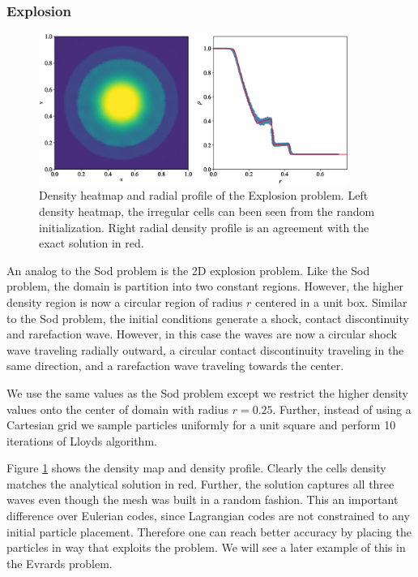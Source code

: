 \subsubsection{Explosion}
\begin{figure}
    \begin{center}
        \includegraphics[width=0.9\textwidth]{figures/explosion_2d.eps}
        \caption{Density heatmap and radial profile of the Explosion problem. Left density
        heatmap, the irregular cells can been seen from the random initialization. Right
        radial density profile is an agreement with the exact solution in red.}
        \label{fig.explosion_2d}
    \end{center}
\end{figure}
An analog to the Sod problem is the 2D explosion problem. Like the Sod problem, the domain
is partition into two constant regions. However, the higher density region is now a circular
region of radius $r$ centered in a unit box. Similar to the Sod problem, the initial 
conditions generate a shock, contact discontinuity and rarefaction wave. However, in this case
the waves are now a circular shock wave traveling radially outward, a circular contact
discontinuity traveling in the same direction, and a rarefaction wave traveling towards the
center.

We use the same values as the Sod problem except we restrict the higher density values onto
the center of domain with radius $r=0.25$. Further, instead of using a Cartesian grid we sample
particles uniformly for a unit square and perform 10 iterations of Lloyds algorithm. 

Figure \ref{fig.explosion_2d} shows the density map and density profile. Clearly the cells
density matches the analytical solution in red. Further, the solution captures all three waves
even though the mesh was built in a random fashion. This an important difference over Eulerian
codes, since Lagrangian codes are not constrained to any initial particle placement. Therefore
one can reach better accuracy by placing the particles in way that exploits the problem. We will
see a later example of this in the Evrards problem.

